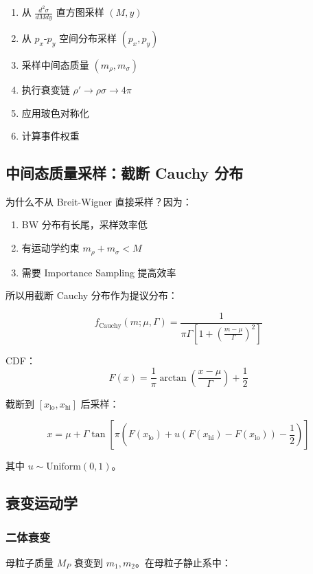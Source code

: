 \documentclass[11pt,a4paper,UTF8]{ctexart}
\begin{document}
\begin{enumerate}[leftmargin=2em]
    \item 从 $\frac{d^2\sigma}{dM dy}$ 直方图采样 $(M, y)$
    \item 从 $p_x$-$p_y$ 空间分布采样 $(p_x, p_y)$
    \item 采样中间态质量 $(m_\rho, m_\sigma)$
    \item 执行衰变链 $\rho' \to \rho\sigma \to 4\pi$
    \item 应用玻色对称化
    \item 计算事件权重
\end{enumerate}

\subsection{中间态质量采样：截断 Cauchy 分布}

为什么不从 Breit-Wigner 直接采样？因为：
\begin{enumerate}[leftmargin=2em]
    \item BW 分布有长尾，采样效率低
    \item 有运动学约束 $m_\rho + m_\sigma < M$
    \item 需要 Importance Sampling 提高效率
\end{enumerate}

所以用截断 Cauchy 分布作为提议分布：

\[
f_{\text{Cauchy}}(m; \mu, \Gamma) = \frac{1}{\pi \Gamma \left[1 + \left(\frac{m-\mu}{\Gamma}\right)^2\right]}
\]

CDF：
\[
F(x) = \frac{1}{\pi} \arctan\left(\frac{x-\mu}{\Gamma}\right) + \frac{1}{2}
\]

截断到 $[x_{\text{lo}}, x_{\text{hi}}]$ 后采样：

\[
x = \mu + \Gamma \tan\left[ \pi \left( F(x_{\text{lo}}) + u(F(x_{\text{hi}}) - F(x_{\text{lo}})) - \frac{1}{2} \right) \right]
\]

其中 $u \sim \text{Uniform}(0,1)$。

\subsection{衰变运动学}

\subsubsection{二体衰变}

母粒子质量 $M_P$ 衰变到 $m_1, m_2$。在母粒子静止系中：
\end{document}
